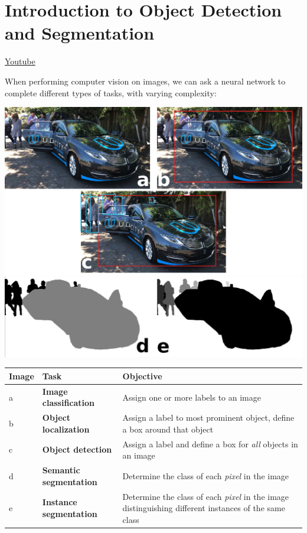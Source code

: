 \chapter{Introduction to Object Detection and Segmentation}
\href{https://www.youtube.com/watch?v=YrwPc8_BJoQ&ab_channel=Udacity}{Youtube} \newline

When performing computer vision on images, we can ask a neural network to complete different types of tasks, with varying complexity:

\includegraphics[width=1\linewidth]{img//cnn//object/tasks.jpg}


\begin{table}
\centering

\begin{tabular}{| l | l | l |}
\hline
\textbf{Image} & \textbf{Task} & \textbf{Objective} \\
\hline

\hline
a & \textbf{Image classification} & Assign one or more labels to an image \\
\hline
b & \textbf{Object localization} & Assign a label to most prominent object, define a box around that object \\
\hline
c & \textbf{Object detection} & Assign a label and define a box for \textit{all} objects in an image \\
\hline
d & \textbf{Semantic segmentation} & Determine the class of each \textit{pixel} in the image \\
\hline
e & \textbf{Instance segmentation} & Determine the class of each \textit{pixel} in the image distinguishing different instances of the same class \\
\hline

\end{tabular}

\end{table}

